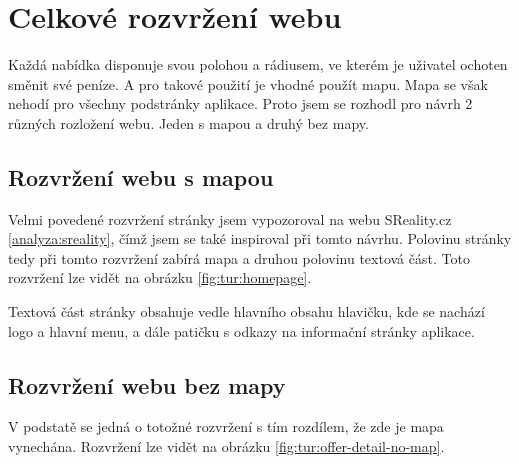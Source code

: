 \section{Celkové rozvržení webu}

\label{nur:layout}

Každá nabídka disponuje svou polohou a rádiusem, ve kterém je uživatel ochoten směnit své peníze. A pro takové použití je vhodné použít mapu. Mapa se však nehodí pro všechny podstránky aplikace. Proto jsem se rozhodl pro návrh 2 různých rozložení webu. Jeden s mapou a druhý bez mapy.

\subsection{Rozvržení webu s mapou}
Velmi povedené rozvržení stránky jsem vypozoroval na webu SReality.cz \ref{analyza:sreality}, čímž jsem se také inspiroval při tomto návrhu. Polovinu stránky tedy při tomto rozvržení zabírá mapa a druhou polovinu textová část. Toto rozvržení lze vidět na obrázku \ref{fig:tur:homepage}.

Textová část stránky obsahuje vedle hlavního obsahu hlavičku, kde se nachází logo a hlavní menu, a dále patičku s odkazy na informační stránky aplikace.

\subsection{Rozvržení webu bez mapy}
V podstatě se jedná o totožné rozvržení s tím rozdílem, že zde je mapa vynechána. Rozvržení lze vidět na obrázku \ref{fig:tur:offer-detail-no-map}.